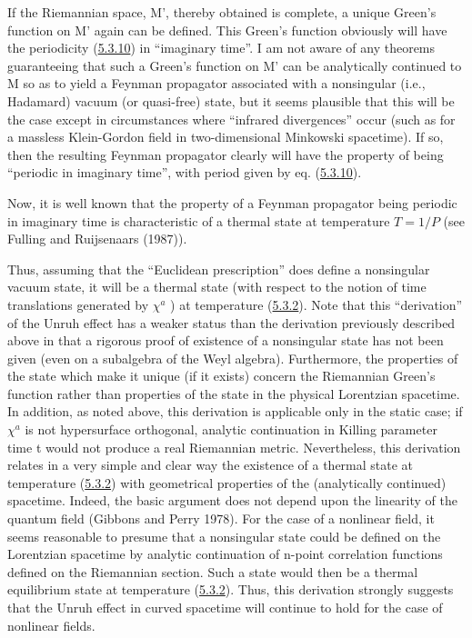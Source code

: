 \documentclass[11pt,a4paper]{article}
\begin{document}
If the Riemannian space, M', thereby obtained is complete, a unique Green's function on M' again can be defined. This Green's function obviously will have the periodicity (\hyperref[eq:5.3.10]{5.3.10}) in ``imaginary time''. I am not aware of any theorems guaranteeing that such a Green's function on M' can be analytically continued to M so as to yield a Feynman propagator associated with a nonsingular (i.e., Hadamard) vacuum (or quasi-free) state, but it seems plausible that this will be the case except in circumstances where ``infrared divergences'' occur (such as for a massless Klein-Gordon field in two-dimensional Minkowski spacetime). If so, then the resulting Feynman propagator clearly will have the property of being ``periodic in imaginary time'', with period given by eq. (\hyperref[eq:5.3.10]{5.3.10}).

Now, it is well known that the property of a Feynman propagator being periodic in imaginary time is characteristic of a thermal state at temperature \(T=1/P\) (see Fulling and Ruijsenaars (1987)).

\hypertarget{source-145}{}

Thus, assuming that the ``Euclidean prescription'' does define a nonsingular vacuum state, it will be a thermal state (with respect to the notion of time translations generated by \(\chi^a\) ) at temperature (\hyperref[eq:5.3.2]{5.3.2}). Note that this ``derivation'' of the Unruh effect has a weaker status than the derivation previously described above in that a rigorous proof of existence of a nonsingular state has not been given (even on a subalgebra of the Weyl algebra). Furthermore, the properties of the state which make it unique (if it exists) concern the Riemannian Green's function rather than properties of the state in the physical Lorentzian spacetime. In addition, as noted above, this derivation is applicable only in the static case; if \(\chi^a\) is not hypersurface orthogonal, analytic continuation in Killing parameter time t would not produce a real Riemannian metric. Nevertheless, this derivation relates in a very simple and clear way the existence of a thermal state at temperature (\hyperref[eq:5.3.2]{5.3.2}) with geometrical properties of the (analytically continued) spacetime. Indeed, the basic argument does not depend upon the linearity of the quantum field (Gibbons and Perry 1978). For the case of a nonlinear field, it seems reasonable to presume that a nonsingular state could be defined on the Lorentzian spacetime by analytic continuation of n-point correlation functions defined on the Riemannian section. Such a state would then be a thermal equilibrium state at temperature (\hyperref[eq:5.3.2]{5.3.2}). Thus, this derivation strongly suggests that the Unruh effect in curved spacetime will continue to hold for the case of nonlinear fields.
\end{document}
